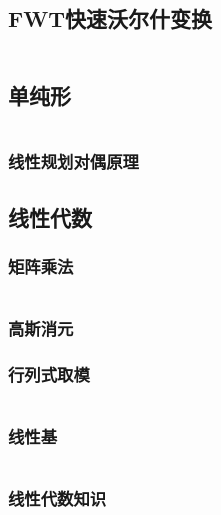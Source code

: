 \documentclass[a4paper]{article}
\begin{document}
\begin{multicols}{2}
			\subsection{FWT快速沃尔什变换}
				\inputminted{cpp}{../src/math/FWT.cpp}

			\subsection{单纯形}
				\inputminted{cpp}{../src/math/单纯形.cpp}

				\subsubsection{线性规划对偶原理}
					

			\subsection{线性代数}
				\subsubsection{矩阵乘法}
					\inputminted{cpp}{../src/math/矩阵乘法.cpp}

				\subsubsection{高斯消元}
					

				\subsubsection{行列式取模}
					\inputminted{cpp}{../src/math/行列式取模.cpp}



				\subsubsection{线性基}
					\inputminted{cpp}{../src/math/线性基.cpp}


				\subsubsection{线性代数知识}
					
				

\end{multicols}
\end{document}
